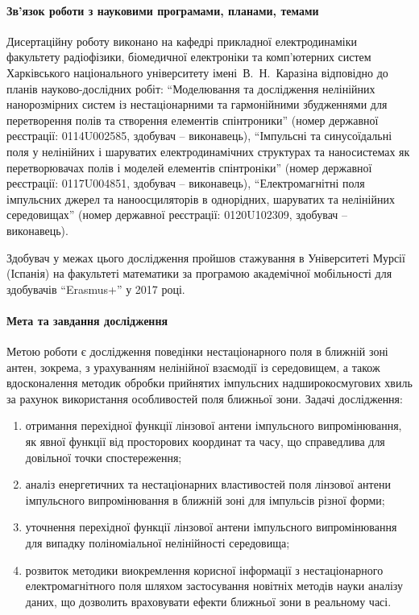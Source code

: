 \paragraph{Зв'язок роботи з науковими програмами, планами, темами}

Дисертаційну роботу виконано на кафедрі прикладної електродинаміки факультету 
радіофізики, біомедичної електроніки та комп’ютерних систем Харківського 
національного університету імені~В.~Н.~Каразіна відповідно до планів 
науково-дослідних робіт: ``Моделювання та дослідження 
нелінійних нанорозмірних систем із нестаціонарними та гармонійними 
збудженнями для перетворення полів та створення елементів спінтроники'' 
(номер державної реєстрації: 0114U002585, здобувач -- виконавець), 
``Імпульсні та синусоїдальні поля у нелінійних і шаруватих електродинамічних 
структурах та наносистемах як перетворювачах полів і моделей елементів 
спінтроніки'' (номер державної реєстрації: 0117U004851, здобувач -- виконавець),
``Електромагнітні поля імпульсних джерел та наноосциляторів в однорідних, 
шаруватих та нелінійних середовищах'' (номер державної реєстрації: 0120U102309, 
здобувач -- виконавець).

Здобувач у межах цього дослідження пройшов стажування в 
Університеті Мурсії (Іспанія) на факультеті математики за програмою
академічної мобільності для здобувачів ``Erasmus+'' у 2017 році.

\paragraph{Мета та завдання дослідження}

Метою роботи є дослідження поведінки нестаціонарного поля в ближній зоні антен, 
зокрема, з урахуванням нелінійної взаємодії із середовищем, а також 
вдосконалення методик обробки прийнятих імпульсних надширокосмугових хвиль за 
рахунок використання особливостей поля ближньої зони. Задачі дослідження:

\begin{enumerate}

\item отримання перехідної функції лінзової антени імпульсного 
випромінювання, як явної функції від просторових координат та часу, що 
справедлива для довільної точки спостереження;

\item аналіз енергетичних та нестаціонарних властивостей поля лінзової антени 
імпульсного випромінювання в ближній зоні для імпульсів різної форми;

\item уточнення перехідної функції лінзової антени імпульсного 
випромінювання для випадку поліноміальної нелінійності середовища;

\item розвиток методики виокремлення корисної інформації з нестаціонарного 
електромагнітного поля шляхом застосування новітніх методів науки аналізу 
даних, що дозволить враховувати ефекти ближньої зони в реальному часі.

\end{enumerate}

